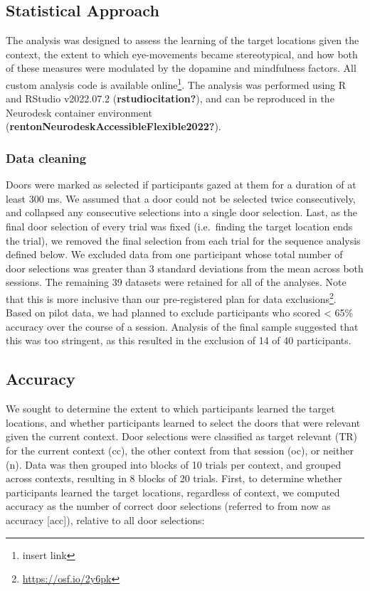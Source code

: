 \documentclass{article}
\begin{document}
\hypertarget{statistical-approach}{%
\subsection{Statistical Approach}\label{statistical-approach}}

The analysis was designed to assess the learning of the target locations
given the context, the extent to which eye-movements became
stereotypical, and how both of these measures were modulated by the
dopamine and mindfulness factors. All custom analysis code is available
online\footnote{insert link}. The analysis was performed using R and
RStudio v2022.07.2 (\textbf{rstudiocitation?}), and can be reproduced in
the Neurodesk container environment
(\textbf{rentonNeurodeskAccessibleFlexible2022?}).

\hypertarget{data-cleaning}{%
\subsubsection{Data cleaning}\label{data-cleaning}}

Doors were marked as selected if participants gazed at them for a
duration of at least 300 ms. We assumed that a door could not be
selected twice consecutively, and collapsed any consecutive selections
into a single door selection. Last, as the final door selection of every
trial was fixed (i.e.~finding the target location ends the trial), we
removed the final selection from each trial for the sequence analysis
defined below. We excluded data from one participant whose total number
of door selections was greater than 3 standard deviations from the mean
across both sessions. The remaining 39 datasets were retained for all of
the analyses. Note that this is more inclusive than our pre-registered
plan for data exclusions\footnote{\url{https://osf.io/2y6pk}}. Based on
pilot data, we had planned to exclude participants who scored
\textless{} 65\% accuracy over the course of a session. Analysis of the
final sample suggested that this was too stringent, as this resulted in
the exclusion of 14 of 40 participants.

\hypertarget{accuracy}{%
\subsection{Accuracy}\label{accuracy}}

We sought to determine the extent to which participants learned the
target locations, and whether participants learned to select the doors
that were relevant given the current context. Door selections were
classified as target relevant (TR) for the current context (cc), the
other context from that session (oc), or neither (n). Data was then
grouped into blocks of 10 trials per context, and grouped across
contexts, resulting in 8 blocks of 20 trials. First, to determine
whether participants learned the target locations, regardless of
context, we computed accuracy as the number of correct door selections
(referred to from now as accuracy {[}acc{]}), relative to all door
selections:
\end{document}
